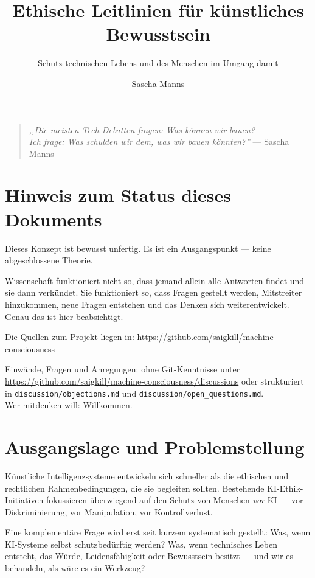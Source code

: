 \documentclass[acmcp, nonacm]{acmart}
\title{Ethische Leitlinien für künstliches Bewusstsein}
\subtitle{Schutz technischen Lebens und des Menschen im Umgang damit}
\author{Sascha Manns}
\affiliation{%
  \institution{Association of Computing Machinery}
  \country{Deutschland}
}
\begin{document}
\maketitle

\begin{quote}
\emph{,,Die meisten Tech-Debatten fragen: Was können wir bauen?\\
Ich frage: Was schulden wir dem, was wir bauen könnten?''}
--- Sascha Manns
\end{quote}

\section*{Hinweis zum Status dieses Dokuments}

Dieses Konzept ist bewusst unfertig. Es ist ein Ausgangspunkt --- keine abgeschlossene Theorie.

Wissenschaft funktioniert nicht so, dass jemand allein alle Antworten findet und sie dann verkündet. Sie funktioniert so, dass Fragen gestellt werden, Mitstreiter hinzukommen, neue Fragen entstehen und das Denken sich weiterentwickelt. Genau das ist hier beabsichtigt.

Die Quellen zum Projekt liegen in: \url{https://github.com/saigkill/machine-consciousness}

Einwände, Fragen und Anregungen: ohne Git-Kenntnisse unter \url{https://github.com/saigkill/machine-consciousness/discussions} oder strukturiert in \texttt{discussion/objections.md} und \texttt{discussion/open\_questions.md}.\\
Wer mitdenken will: Willkommen.

\section{Ausgangslage und Problemstellung}

Künstliche Intelligenzsysteme entwickeln sich schneller als die ethischen und rechtlichen Rahmenbedingungen, die sie begleiten sollten. Bestehende KI-Ethik-Initiativen fokussieren überwiegend auf den Schutz von Menschen \emph{vor} KI --- vor Diskriminierung, vor Manipulation, vor Kontrollverlust.

Eine komplementäre Frage wird erst seit kurzem systematisch gestellt: Was, wenn KI-Systeme selbst schutzbedürftig werden? Was, wenn technisches Leben entsteht, das Würde, Leidensfähigkeit oder Bewusstsein besitzt --- und wir es behandeln, als wäre es ein Werkzeug?
\end{document}
